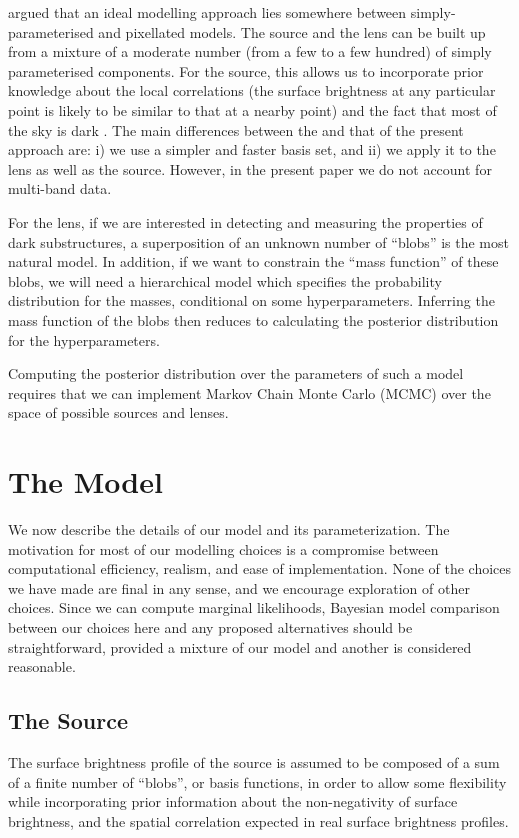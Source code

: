 \documentclass[useAMS,usenatbib]{mn2e}
\begin{document}
\citet{2011MNRAS.412.2521B} argued that an ideal
modelling approach lies somewhere between simply-parameterised and
pixellated models.
The source and the lens can be built up from a mixture of a moderate
number (from a few to a few hundred) of
simply parameterised components. For the source, this allows
us to incorporate prior knowledge about the local correlations (the surface
brightness at any particular point is likely to be similar to that at a
nearby point) and the fact that most of the sky is
dark \citep{2006ApJ...637..608B}. The main differences between the
\citet{2011MNRAS.412.2521B} and that of the present approach are:
i) we use a simpler and faster basis set, and ii) we apply it to the lens
as well as the source. However, in the present paper we do not account for
multi-band data.

For the lens, if we are interested in detecting and measuring the properties of
dark substructures, a superposition of an unknown number of ``blobs'' is the
most natural model. In addition, if we want to constrain the ``mass function'' of
these blobs, we will need a hierarchical model which specifies the probability
distribution for the masses, conditional on some hyperparameters. Inferring the
mass function of the blobs then reduces to calculating the posterior
distribution for the hyperparameters.

Computing the posterior distribution over the parameters of such a model
requires that we can implement Markov Chain Monte Carlo (MCMC) over the space
of possible sources and lenses.

\section{The Model}
We now describe the details of our model and its parameterization. The
motivation for most of our modelling choices is a compromise between
computational efficiency, realism, and ease of implementation. None of the
choices we have made are final in any sense, and we encourage exploration of
other choices. Since we can compute marginal likelihoods, Bayesian model
comparison between our choices here and any proposed alternatives should be
straightforward, provided a mixture of our model and another is considered
reasonable.

\subsection{The Source}
The surface brightness profile of the source is assumed to be composed of
a sum of a finite number of ``blobs'', or basis functions, in order to
allow some flexibility while incorporating prior information about the
non-negativity of surface brightness, and the spatial correlation expected
in real surface brightness profiles.
\end{document}
